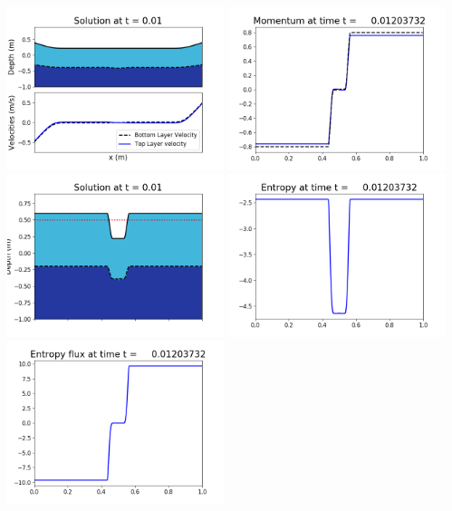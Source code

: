 \documentclass[11pt]{article}
\begin{document}
\includegraphics[width=0.475\textwidth]{frame0034fig1002.png}
\vskip 10pt 
\includegraphics[width=0.475\textwidth]{frame0034fig1003.png}
\includegraphics[width=0.475\textwidth]{frame0034fig1006.png}
\vskip 10pt 
\includegraphics[width=0.475\textwidth]{frame0034fig1007.png}
\includegraphics[width=0.475\textwidth]{frame0034fig1008.png}
\end{document}
